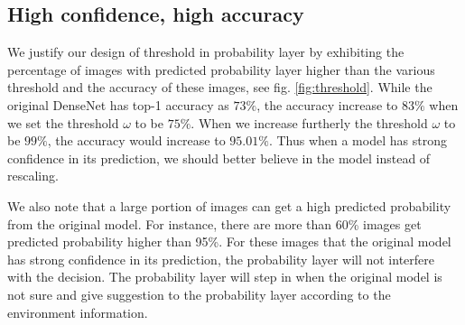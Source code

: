 \documentclass{article}
\begin{document}
\subsection{High confidence, high accuracy}
We justify our design of threshold in probability layer by exhibiting the percentage of images with predicted probability layer higher than the various threshold and the accuracy of these images, see fig. \ref{fig:threshold}. While the original DenseNet has top-1 accuracy as $73\%$, the accuracy increase to $83\%$ when we set the threshold $\omega$ to be $75\%$. When we increase furtherly the threshold $\omega$ to be $99\%$, the accuracy would increase to $95.01\%$. Thus when a model has strong confidence in its prediction, we should better believe in the model instead of rescaling. 

We also note that a large portion of images can get a high predicted probability from the original model. For instance, there are more than 60\% images get predicted probability higher than 95\%. For these images that the original model has strong confidence in its prediction, the probability layer will not interfere with the decision. The probability layer will step in when the original model is not sure and give suggestion to the probability layer according to the environment information. 
\end{document}
